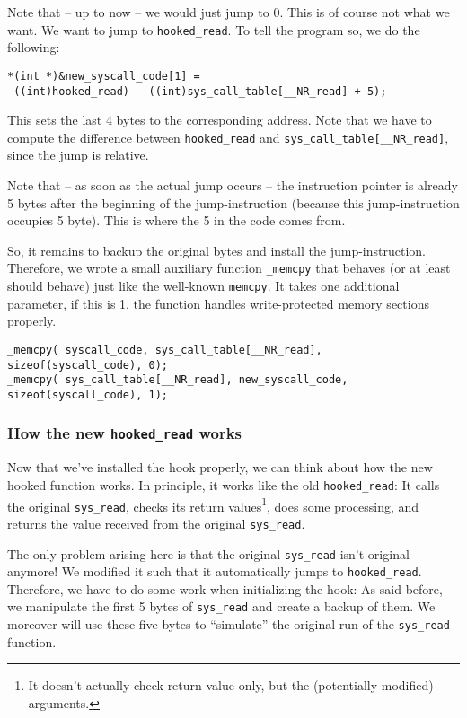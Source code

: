 \documentclass[10pt, letterpaper]{scrartcl}
\begin{document}
Note that -- up to now -- we would just jump to 0. This is of course not what we want. We want to jump to \texttt{hooked\_read}. To tell the program so, we do the following:

\begin{verbatim}
*(int *)&new_syscall_code[1] = 
 ((int)hooked_read) - ((int)sys_call_table[__NR_read] + 5);
\end{verbatim}

This sets the last 4 bytes to the corresponding address. Note that we have to compute the difference between \texttt{hooked\_read} and \texttt{sys\_call\_table[\_\_NR\_read]}, since the jump is relative. 

Note that -- as soon as the actual jump occurs -- the instruction pointer is already 5 bytes after the beginning of the jump-instruction (because this jump-instruction occupies 5 byte). This is where the 5 in the code comes from.

So, it remains to backup the original bytes and install the jump-instruction. Therefore, we wrote a small auxiliary function \texttt{\_memcpy} that behaves (or at least should behave) just like the well-known \texttt{memcpy}. It takes one additional parameter, if this is 1, the function handles write-protected memory sections properly.

\begin{verbatim}
_memcpy( syscall_code, sys_call_table[__NR_read], sizeof(syscall_code), 0);
_memcpy( sys_call_table[__NR_read], new_syscall_code, sizeof(syscall_code), 1);
\end{verbatim}

\subsubsection{How the new \texttt{hooked\_read} works}
\label{sec:hooked-read-2-technique}

Now that we've installed the hook properly, we can think about how the new hooked function works. In principle, it works like the old \texttt{hooked\_read}: It calls the original \texttt{sys\_read}, checks its return values\footnote{It doesn't actually check return value only, but the (potentially modified) arguments.}, does some processing, and returns the value received from the original \texttt{sys\_read}.

The only problem arising here is that the original \texttt{sys\_read} isn't original anymore! We modified it such that it automatically jumps to \texttt{hooked\_read}. Therefore, we have to do some work when initializing the hook: As said before, we manipulate the first 5 bytes of \texttt{sys\_read} and create a backup of them. We moreover will use these five bytes to ``simulate'' the original run of the \texttt{sys\_read} function.
\end{document}
